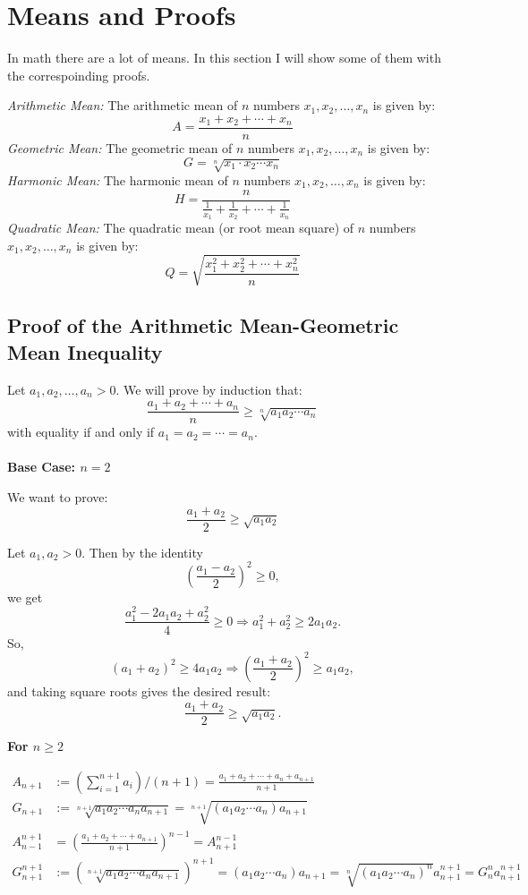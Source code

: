 \section{Means and Proofs}
In math there are a lot of means. In this section I will show some of them with the correspoinding proofs.

\emph{Arithmetic Mean:} The arithmetic mean of \( n \) numbers \( x_1, x_2, \dots, x_n \) is given by:
	      \[
		      A = \frac{x_1 + x_2 + \cdots + x_n}{n}
	      \]
\emph{Geometric Mean:} The geometric mean of \( n \) numbers \( x_1, x_2, \dots, x_n \) is given by:
	      \[
		      G = \sqrt[n]{x_1 \cdot x_2 \cdots x_n}
	      \]
\emph{Harmonic Mean:} The harmonic mean of \( n \) numbers \( x_1, x_2, \dots, x_n \) is given by:
	      \[
		      H = \frac{n}{\frac{1}{x_1} + \frac{1}{x_2} + \cdots + \frac{1}{x_n}}
	      \]
\emph{Quadratic Mean:} The quadratic mean (or root mean square) of \( n \) numbers \( x_1, x_2, \dots, x_n \) is given by:
	      \[
		      Q = \sqrt{\frac{x_1^2 + x_2^2 + \cdots + x_n^2}{n}}
	      \]

\subsection{Proof of the Arithmetic Mean-Geometric Mean Inequality}

Let \( a_1, a_2, \dots, a_n > 0 \). We will prove by induction that:
\[
	\frac{a_1 + a_2 + \cdots + a_n}{n} \geq \sqrt[n]{a_1 a_2 \cdots a_n}
\]
with equality if and only if \( a_1 = a_2 = \cdots = a_n \).
\\\\
\textbf{Base Case: \( n = 2 \)}

We want to prove:
\[
	\frac{a_1 + a_2}{2} \geq \sqrt{a_1 a_2}
\]

Let \( a_1, a_2 > 0 \). Then by the identity
\[
	\left( \frac{a_1 - a_2}{2} \right)^2 \geq 0,
\]
we get
\[
	\frac{a_1^2 - 2a_1a_2 + a_2^2}{4} \geq 0 \Rightarrow a_1^2 + a_2^2 \geq 2a_1a_2.
\]
So,
\[
	(a_1 + a_2)^2 \geq 4a_1a_2 \Rightarrow \left( \frac{a_1 + a_2}{2} \right)^2 \geq a_1a_2,
\]
and taking square roots gives the desired result:
\[
	\frac{a_1 + a_2}{2} \geq \sqrt{a_1 a_2}.
\]

\textbf{For \( n \geq 2 \)}

\begin{align*}
	A_{n + 1} &:= (\sum_{i=1}^{n + 1} a_i) / (n + 1) = \frac{a_1 + a_2 + \cdots + a_n + a_{n + 1}}{n + 1}\\
	G_{n + 1} &:= \sqrt[n + 1]{a_1 a_2 \cdots a_n a_{n + 1}} = \sqrt[n + 1]{(a_1 a_2 \cdots a_n) a_{n + 1}}\\
	A_{n - 1}^{n + 1}&= (\frac{a_1 + a_2 + \cdots + a_{n + 1}}{n + 1})^{n - 1} = A_{n + 1}^{n - 1}\\
	G_{n + 1}^{n + 1} &:= (\sqrt[n + 1]{a_1 a_2 \cdots a_n a_{n + 1}})^{n + 1} = (a_1 a_2 \cdots a_n) a_{n + 1} = \sqrt[n]{(a_1 a_2 \cdots a_n)^{n}} a_{n + 1}^{n + 1} = G_{n}^{n} a_{n + 1}^{n + 1}
\end{align*}

